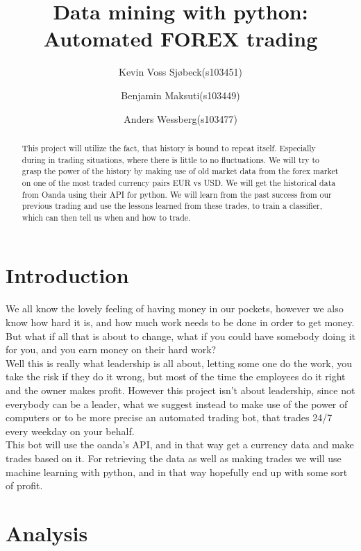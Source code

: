 \documentclass[10pt]{IEEEtran}
\title{Data mining with python: \\Automated FOREX trading}
\author{
	Kevin Voss Sjøbeck(s103451)\\
	\and
	Benjamin Maksuti(s103449)\\
	\and
	Anders Wessberg(s103477)
}
\begin{document}
\maketitle

\begin{abstract}
This project will utilize the fact, that history is bound to repeat itself. Especially during in trading situations, where there is little to no fluctuations. We will try to grasp the power of the history by making use of old market data from the forex market on one of the most traded currency pairs EUR vs USD. We will get the historical data from Oanda using their API for python. We will learn from the past success from our previous trading and use the lessons learned from these trades, to train a classifier, which can then tell us when and how to trade.
\end{abstract}

\section{Introduction}
We all know the lovely feeling of having money in our pockets, however we also know how hard it is, and how much work needs to be done in order to get money. But what if all that is about to change, what if you could have somebody doing it for you, and you earn money on their hard work?\\
	Well this is really what leadership is all about, letting some one do the work, you take the risk if they do it wrong, but most of the time the employees do it right and the owner makes profit. However this project isn't about leadership, since not everybody can be a leader, what we suggest instead to make use of the power of computers or to be more precise an automated trading bot, that trades 24/7 every weekday on your behalf.\\
	This bot will use the oanda's API, and in that way get a currency data and make trades based on it.
For retrieving the data as well as making trades we will use machine learning with python, and in that way hopefully end up with some sort of profit.


\section{Analysis}
\end{document}
